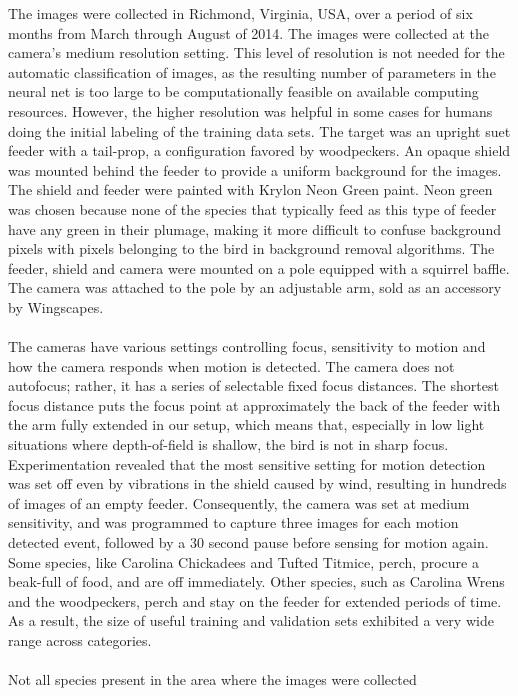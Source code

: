 \documentclass[11pt]{article}
\begin{document}
\noindent The images were collected
in Richmond, Virginia, USA, over a period of six months from
March through August of 2014. The images
were collected at the camera's medium resolution setting. This level of
resolution is not needed for the automatic classification of images,
as the resulting number of parameters in the neural net is too large
to be computationally feasible on available computing resources.
However, the higher resolution was helpful in some cases for humans
doing the initial labeling of the training data sets.
The target was an upright suet feeder with a
tail-prop, a configuration favored by woodpeckers. An opaque shield
was mounted behind the feeder to provide a uniform background for the
images. The shield and feeder were painted with Krylon Neon Green paint.
Neon green was chosen because none of the species that typically feed
as this type of feeder have any green in their plumage, making it more
difficult to confuse background pixels with pixels belonging to the
bird in background removal algorithms. The feeder, shield and camera
were mounted on a pole equipped with a squirrel baffle. The camera was
attached to the pole by an adjustable arm, sold as an accessory by
Wingscapes.\\ \\
The cameras have various settings controlling focus,  sensitivity to motion
and how the camera responds when motion is detected. The camera does not
autofocus; rather, it has a series of selectable fixed focus distances.
The shortest focus distance puts the focus point at approximately the
back of the feeder with the arm fully extended in our setup, which means
that, especially in low light situations where depth-of-field is shallow,
the bird is not in sharp focus. Experimentation revealed that the most
sensitive setting for motion detection was set off even by vibrations
in the shield caused by wind, resulting in hundreds of images of an
empty feeder. Consequently, the camera was set at medium sensitivity,
and was programmed to capture three images for each motion detected
event, followed by a 30 second pause before sensing for motion again.
Some species, like Carolina Chickadees and Tufted Titmice, perch,
procure a beak-full of food, and are off immediately. Other species,
such as Carolina Wrens and the woodpeckers, perch and stay on the
feeder for extended periods of time. As a result, the size of useful
training and validation sets exhibited a very wide range across categories.\\ \\
Not all species present in the area where the images were collected
\end{document}
